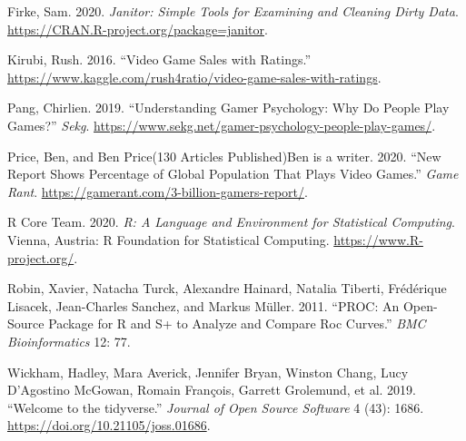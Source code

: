 \documentclass[
]{article}
\begin{document}
\hypertarget{refs}{}
\leavevmode\hypertarget{ref-janitor}{}%
Firke, Sam. 2020. \emph{Janitor: Simple Tools for Examining and Cleaning
Dirty Data}. \url{https://CRAN.R-project.org/package=janitor}.

\leavevmode\hypertarget{ref-kirubi_2016}{}%
Kirubi, Rush. 2016. ``Video Game Sales with Ratings.''
\url{https://www.kaggle.com/rush4ratio/video-game-sales-with-ratings}.

\leavevmode\hypertarget{ref-pang_2019}{}%
Pang, Chirlien. 2019. ``Understanding Gamer Psychology: Why Do People
Play Games?'' \emph{Sekg}.
\url{https://www.sekg.net/gamer-psychology-people-play-games/}.

\leavevmode\hypertarget{ref-price_ben}{}%
Price, Ben, and Ben Price(130 Articles Published)Ben is a writer. 2020.
``New Report Shows Percentage of Global Population That Plays Video
Games.'' \emph{Game Rant}.
\url{https://gamerant.com/3-billion-gamers-report/}.

\leavevmode\hypertarget{ref-citeR}{}%
R Core Team. 2020. \emph{R: A Language and Environment for Statistical
Computing}. Vienna, Austria: R Foundation for Statistical Computing.
\url{https://www.R-project.org/}.

\leavevmode\hypertarget{ref-pROC}{}%
Robin, Xavier, Natacha Turck, Alexandre Hainard, Natalia Tiberti,
Frédérique Lisacek, Jean-Charles Sanchez, and Markus Müller. 2011.
``PROC: An Open-Source Package for R and S+ to Analyze and Compare Roc
Curves.'' \emph{BMC Bioinformatics} 12: 77.

\leavevmode\hypertarget{ref-tidyverse}{}%
Wickham, Hadley, Mara Averick, Jennifer Bryan, Winston Chang, Lucy
D'Agostino McGowan, Romain François, Garrett Grolemund, et al. 2019.
``Welcome to the tidyverse.'' \emph{Journal of Open Source Software} 4
(43): 1686. \url{https://doi.org/10.21105/joss.01686}.
\end{document}
